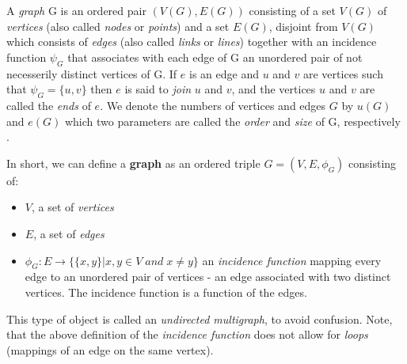 \begin{definition}\label{graph_def}
  A \textit{graph} G is an ordered pair $(V(G), E(G))$ consisting of a set
$V(G)$ of \textit{vertices} (also called \textit{nodes} or \textit{points}) and a set
$E(G)$, disjoint from $V(G)$ which consists of \textit{edges} (also called \textit{links}
or \textit{lines}) together with an incidence function $\psi_G$ that associates with each
edge of G an unordered pair of not necesserily distinct vertices of G.  If $e$ is an edge
and $u$ and $v$ are vertices such that $\psi_G =\{u, v\}$ then $e$ is said to \textit{join}
$u$ and $v$, and the vertices $u$ and $v$ are called the \textit{ends} of $e$. We denote
the numbers of vertices and edges $G$ by $u(G)$ and $e(G)$ which two parameters are called
the \textit{order} and \textit{size} of G, respectively \cite{book:2008}.

  In short, we can define a \textbf{graph} as an ordered triple $G=(V, E, \phi_G)$
consisting of:
  \begin{itemize}
  \item $V$, a set of \textit{vertices}
  \item $E$, a set of \textit{edges}
  \item $\phi_G: E \rightarrow \{\{x, y\} | x, y \in V \; and \; x \neq y\}$ an
\textit{incidence function} mapping every edge to an unordered pair of vertices - an edge
associated with two distinct vertices. The incidence function is a function of the edges.
  \end{itemize} This type of object is called an \textit{undirected multigraph}, to avoid
confusion. Note, that the above definition of the \textit{incidence function} does not
allow for \textit{loops} (mappings of an edge on the same vertex).


\end{definition}
